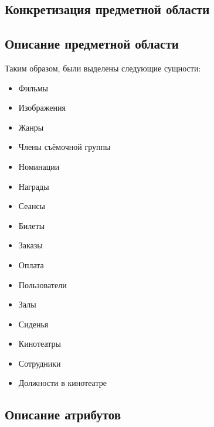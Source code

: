 \documentclass[a4paper,12pt]{article}
\renewcommand{\^}[2]{#1^{\, #2} \kern -1pt}
\newcommand{\1}{\kern 1pt}
\newcommand{\0}{\kern -1pt}
\begin{document}
	\newpage
	
	\subsection{Конкретизация предметной области}
	
	\newpage
	
	\subsection{Описание предметной области}
	
	Таким образом, были выделены следующие сущности:
	
	\begin{itemize}
		\setlength\itemsep{0.05cm}
		
		\item Фильмы
		
		\item Изображения
		
		\item Жанры
		
		\item Члены съёмочной группы
		
		\item Номинации
		
		\item Награды
		
		\item Сеансы
		
		\item Билеты
		
		\item Заказы
		
		\item Оплата
		
		\item Пользователи
		
		\item Залы
		
		\item Сиденья
		
		\item Кинотеатры
		
		\item Сотрудники
		
		\item Должности в кинотеатре
	\end{itemize}
	
	\newpage
	
	\subsection{Описание атрибутов}
	
\end{document}
